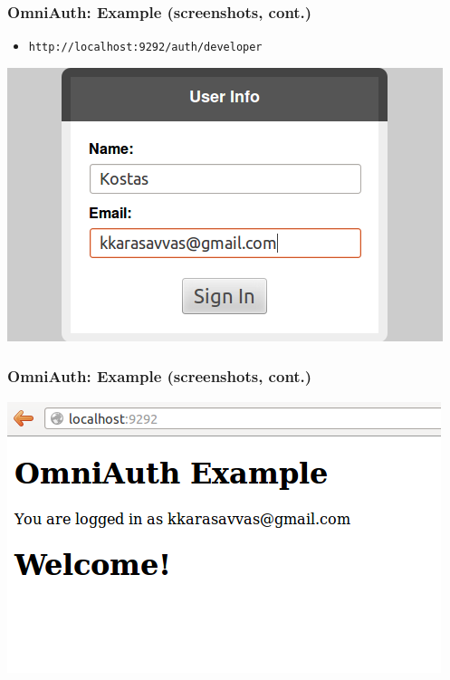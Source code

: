 \documentclass{beamer}
\begin{document}
\begin{frame}\frametitle{OmniAuth: Example (screenshots, cont.)} 

  \begin{itemize}
    \item \texttt{http://localhost:9292/auth/developer}
  \end{itemize}
  
  \begin{center}
    \includegraphics[scale=0.5]{images/oauth2.png}  
  \end{center}
    
\end{frame}




\begin{frame}\frametitle{OmniAuth: Example (screenshots, cont.)} 

  \begin{center}
    \includegraphics[scale=0.5]{images/oauth3.png}  
  \end{center}
    
\end{frame}
\end{document}

